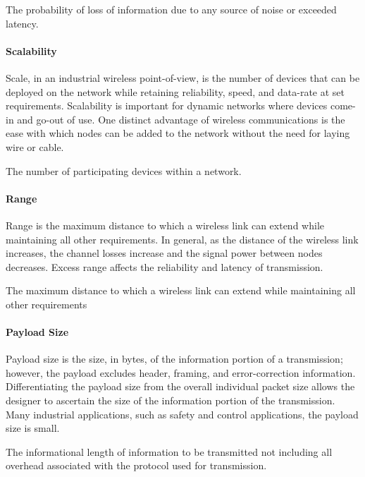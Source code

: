 {\begin{definition}[Reliability] \label{def:reliability}
	The probability of loss of information due to any source of noise or exceeded latency.
\end{definition}

\paragraph{Scalability}
Scale, in an industrial wireless point-of-view, is the number of devices that can be deployed on the network while retaining reliability, speed, and data-rate at set requirements. Scalability is important for dynamic networks where devices come-in and go-out of use. One distinct advantage of wireless communications is the ease with which nodes can be added to the network without the need for laying wire or cable.
\begin{definition}[Scale] \label{def:scale}
	The number of participating devices within a network.
\end{definition}

\paragraph{Range}
Range is the maximum distance to which a wireless link can extend while maintaining all other requirements. In general, as the distance of the wireless link increases, the channel losses increase and the signal power between nodes decreases. Excess range affects the reliability and latency of transmission.
\begin{definition}[Range] \label{def:range}
	The maximum distance to which a wireless link can extend while maintaining all other requirements
\end{definition}

\paragraph{Payload Size}
Payload size is the size, in bytes, of the information portion of a transmission; however, the payload excludes header, framing, and error-correction information. Differentiating the payload size from the overall individual packet size allows the designer to ascertain the size of the information portion of the transmission. Many industrial applications, such as safety and control applications, the payload size is small.
\begin{definition} \label{def:payloadsize}
	The informational length of information to be transmitted not including all overhead associated with the protocol used for transmission.
\end{definition}

}
